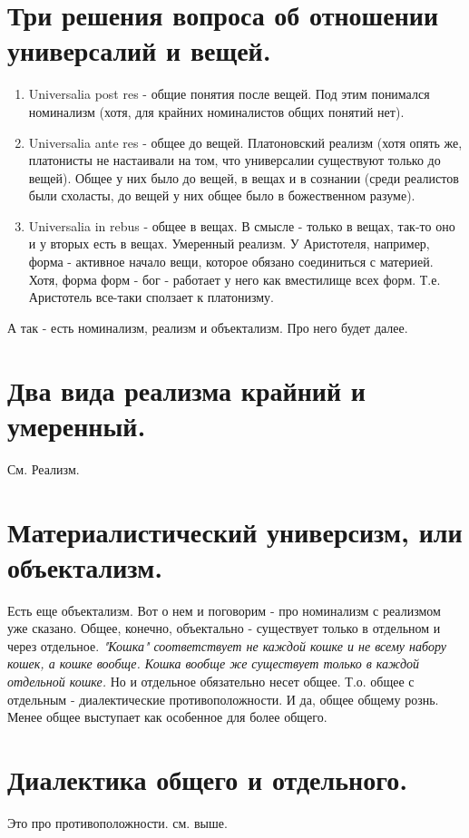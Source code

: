 \section{ Три решения вопроса об отношении универсалий и вещей.}
\begin{enumerate}
\item Universalia post res - общие понятия после вещей. Под этим понимался номинализм (хотя, для крайних номиналистов общих понятий нет).
\item Universalia ante res - общее до вещей. Платоновский реализм (хотя опять же, платонисты не настаивали на том, что универсалии существуют только до вещей). Общее у них было до вещей, в вещах и в сознании (среди реалистов были схоласты, до вещей у них общее было в божественном разуме).
\item Universalia in rebus - общее в вещах. В смысле - только в вещах, так-то оно и у вторых есть в вещах. Умеренный реализм. У Аристотеля, например, форма - активное начало вещи, которое обязано соединиться с материей. Хотя, форма форм - бог - работает у него как вместилище всех форм. Т.е. Аристотель все-таки сползает к платонизму.
\end{enumerate}
А так - есть номинализм, реализм и объектализм. Про него будет далее.

\section{ Два вида реализма крайний и умеренный.}
См. Реализм.

\section{ Материалистический универсизм, или объектализм.}
Есть еще объектализм. Вот о нем и поговорим - про номинализм с реализмом уже сказано. Общее, конечно, объектально - существует только в отдельном и через отдельное. \textit{"Кошка" соответствует не каждой кошке и не всему набору кошек, а кошке вообще. Кошка вообще же существует только в каждой отдельной кошке.} Но и отдельное обязательно несет общее. Т.о. общее с отдельным - диалектические противоположности. И да, общее общему рознь. Менее общее выступает как особенное для более общего.

\section{ Диалектика общего и отдельного.}
Это про противоположности. см. выше.

